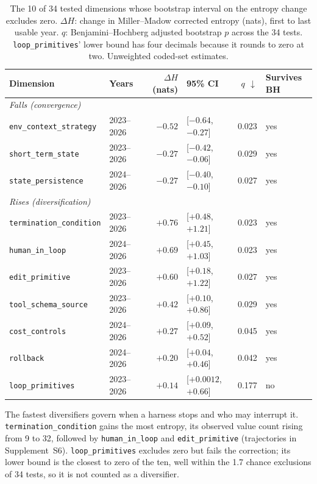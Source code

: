 \begin{table}[tbp]
\caption{The 10 of 34 tested dimensions whose bootstrap interval on the entropy change excludes zero.
$\Delta H$: change in Miller--Madow corrected entropy (nats), first to last usable year. $q$:
Benjamini--Hochberg adjusted bootstrap $p$ across the 34 tests. \texttt{loop\_primitives}' lower bound
has four decimals because it rounds to zero at two. Unweighted coded-set estimates.}
\label{tab:landscape_entropy}
\footnotesize
\begin{tabular}{llrlrl}
\toprule
Dimension & Years & $\Delta H$ (nats) & 95\% CI & $q$ $\downarrow$ & Survives BH \\
\midrule
\multicolumn{6}{l}{\emph{Falls (convergence)}} \\
\texttt{env\_context\_strategy}   & 2023--2026 & $-0.52$ & [$-0.64$, $-0.27$]  & 0.023 & yes \\
\texttt{short\_term\_state}       & 2023--2026 & $-0.27$ & [$-0.42$, $-0.06$]  & 0.029 & yes \\
\texttt{state\_persistence}       & 2024--2026 & $-0.27$ & [$-0.40$, $-0.10$]  & 0.027 & yes \\
\midrule
\multicolumn{6}{l}{\emph{Rises (diversification)}} \\
\texttt{termination\_condition}   & 2023--2026 & $+0.76$ & [$+0.48$, $+1.21$]  & 0.023 & yes \\
\texttt{human\_in\_loop}          & 2024--2026 & $+0.69$ & [$+0.45$, $+1.03$]  & 0.023 & yes \\
\texttt{edit\_primitive}          & 2023--2026 & $+0.60$ & [$+0.18$, $+1.22$]  & 0.027 & yes \\
\texttt{tool\_schema\_source}     & 2023--2026 & $+0.42$ & [$+0.10$, $+0.86$]  & 0.029 & yes \\
\texttt{cost\_controls}           & 2024--2026 & $+0.27$ & [$+0.09$, $+0.52$]  & 0.045 & yes \\
\texttt{rollback}                 & 2024--2026 & $+0.20$ & [$+0.04$, $+0.46$]  & 0.042 & yes \\
\texttt{loop\_primitives}         & 2023--2026 & $+0.14$ & [$+0.0012$, $+0.66$] & 0.177 & no \\
\bottomrule
\end{tabular}
\end{table}

The fastest diversifiers govern when a harness stops and who may interrupt it.
\texttt{termination\_condition} gains the most entropy, its observed value count rising from 9 to 32,
followed by \texttt{human\_in\_loop} and \texttt{edit\_primitive} (trajectories in Supplement~S6).
\texttt{loop\_primitives} excludes zero but fails the correction; its lower bound is the closest to zero
of the ten, well within the 1.7 chance exclusions of 34 tests, so it is not counted as a diversifier.

